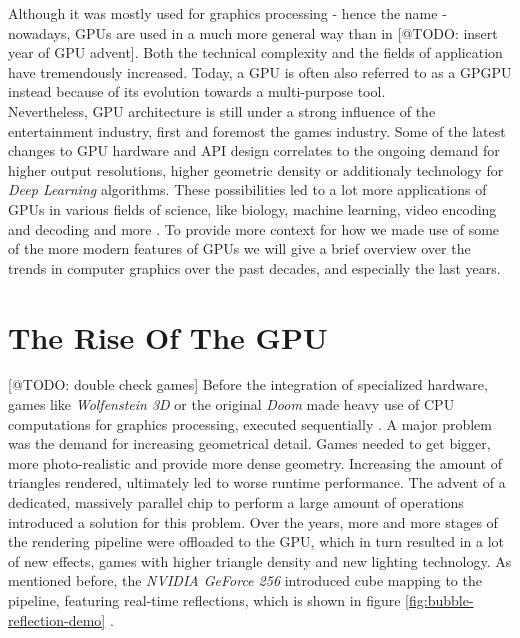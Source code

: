 \noindent
Although it was mostly used for graphics processing - hence the name - nowadays, \ac{GPU}s
are used in a much more general way than in [@TODO: insert year of GPU advent]. Both the 
technical complexity and the fields of application have tremendously increased. Today, a 
\ac{GPU} is often also referred to as a \ac{GPGPU} instead because of its evolution towards 
a multi-purpose tool. \\

\noindent
Nevertheless, \ac{GPU} architecture is still under a strong influence of the entertainment 
industry, first and foremost the games industry. Some of the latest changes to \ac{GPU} 
hardware and \ac{API} design correlates to the ongoing demand for higher output resolutions, 
higher geometric density or additionaly technology for \emph{Deep Learning} algorithms. 
These possibilities led to a lot more applications of \ac{GPU}s in various fields of science, 
like biology, machine learning, video encoding and decoding and more \cite{Battaglia2024}.
To provide more context for how we made use of some of the more modern features of \ac{GPU}s 
we will give a brief overview over the trends in computer graphics over the past decades, and 
especially the last years.


\section{The Rise Of The GPU}

[@TODO: double check games]
Before the integration of specialized hardware, games like \emph{Wolfenstein 3D} or the 
original \emph{Doom} made heavy use of \ac{CPU} computations for graphics processing, 
executed sequentially \cite{NVIDIA1999}. A major problem was the demand for increasing 
geometrical detail. Games needed to get bigger, more photo-realistic and provide more dense 
geometry. Increasing the amount of triangles rendered, ultimately led to worse runtime 
performance. The advent of a dedicated, massively parallel chip to perform a large amount of 
operations introduced a solution for this problem. Over the years, more and more stages of the 
rendering pipeline were offloaded to the \ac{GPU}, which in turn resulted in a lot of new effects, 
games with higher triangle density and new lighting technology. As mentioned before, the \emph{NVIDIA 
GeForce 256} introduced cube mapping to the pipeline, featuring real-time reflections, which is 
shown in figure \ref{fig:bubble-reflection-demo} \cite{Battaglia2024}.

